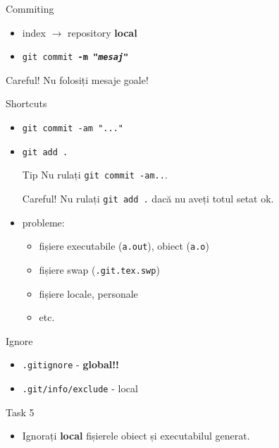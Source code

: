 \documentclass{beamer}
\begin{document}
\begin{frame}{Commiting}
  \begin{itemize}
    \item index $\rightarrow$ repository \textbf{local}
    \item \texttt{git commit \textbf{-m "\textit{mesaj}"}}
  \end{itemize}
  \begin{alertblock}{Careful!}
    Nu folosiți mesaje goale!
  \end{alertblock}
\end{frame}

\begin{frame}{Shortcuts}
  \begin{itemize}
    \item \texttt{git commit -am "..."}
    \item \texttt{git add .}
    \pause
    \begin{alertblock}{Tip}
      Nu rulați \texttt{git commit -am..}.
    \end{alertblock}
    \begin{alertblock}{Careful!}
      Nu rulați \texttt{git add .} dacă nu aveți totul setat ok.
    \end{alertblock}
    \pause
    \item probleme:
      \begin{itemize}
        \item fișiere executabile (\texttt{a.out}), obiect (\texttt{a.o})
        \item fișiere swap (\texttt{.git.tex.swp})
        \item fișiere locale, personale
        \item etc.
      \end{itemize}
  \end{itemize}
\end{frame}

\begin{frame}{Ignore}
  \begin{itemize}
    \item \texttt{.gitignore} - \textbf{global!!}
    \item \texttt{.git/info/exclude} - local
  \end{itemize}
  \pause
  \begin{alertblock}{Task 5}
    \begin{itemize}
      \item Ignorați \textbf{local} fișierele obiect și executabilul generat.
    \end{itemize}
  \end{alertblock}
\end{frame}
\end{document}
